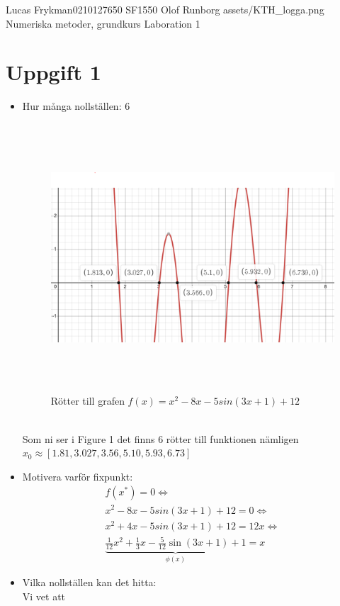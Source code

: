 \documentclass{assignment}
\begin{document}
\assignmentTitle
{Lucas Frykman}{0210127650}
{SF1550}
{Olof Runborg}
{assets/KTH_logga.png}
{Numeriska metoder, grundkurs}
{Laboration 1}

\section*{Uppgift 1}

\begin{itemize}
    \item Hur många nollställen: 6
    \begin{figure}[!h]
        \caption{Rötter till grafen $f(x)=x^2-8x-5sin(3x+1)+12$}
        \centering
        \includegraphics[width=120mm,height=100mm]{assets/rootsgraph.PNG}
    \end{figure}
    \\ Som ni ser i Figure 1 det finns 6 rötter till funktionen nämligen 
    $x_0 \approx [1.81,3.027,3.56,5.10,5.93,6.73]$
    \newpage
    \item Motivera varför fixpunkt: 
    \begin{align}
        f(x^{*})=0 \Leftrightarrow
        \\ x^2-8x-5sin(3x+1)+12 = 0 \Leftrightarrow \nonumber
        \\ x^2+4x-5sin(3x+1)+12 = 12x \Leftrightarrow \nonumber
        \\ \underbrace{\frac{1}{12}x^2+\frac{1}{3}x-\frac{5}{12}\sin(3x+1)+1}_{\phi (x)} = x
    \end{align}

    \item Vilka nollställen kan det hitta: 
    \\ Vi vet att 


\end{itemize}
\end{document}
